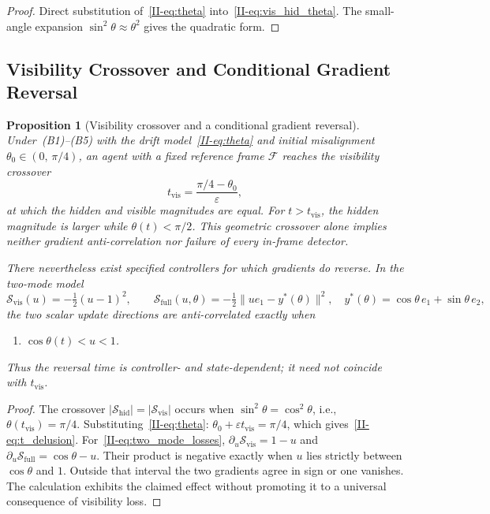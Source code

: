 \documentclass[12pt,a4paper,openany]{book}
\newtheorem{proposition}[theorem]{Proposition}
\begin{document}
\begin{proof}
Direct substitution of~\eqref{II-eq:theta}
into~\eqref{II-eq:vis_hid_theta}.
The small-angle expansion $\sin^2\theta\approx\theta^2$ gives the
quadratic form.
\end{proof}

\subsection{Visibility Crossover and Conditional Gradient Reversal}
\label{II-subsec:delusion}

\begin{proposition}[Visibility crossover and a conditional gradient reversal]
\label{II-prop:delusion_model}
Under~\textup{(B1)--(B5)} with the drift
model~\eqref{II-eq:theta} and initial misalignment
$\theta_0 \in (0,\,\pi/4)$, an agent with a fixed
reference frame $\mathcal{F}$ reaches the visibility crossover
\begin{equation}
\label{II-eq:t_delusion}
t_{\mathrm{vis}}
= \frac{\pi/4-\theta_0}{\varepsilon},
\end{equation}
at which the hidden and visible magnitudes are equal.  For
$t>t_{\mathrm{vis}}$, the hidden magnitude is larger while
$\theta(t)<\pi/2$.  This geometric crossover alone implies neither
gradient anti-correlation nor failure of every in-frame detector.

There nevertheless exist specified controllers for which gradients do
reverse.  In the two-mode model
\begin{equation}
\label{II-eq:two_mode_losses}
\mathcal S_{\mathrm{vis}}(u)=-\tfrac12(u-1)^2,
\qquad
\mathcal S_{\mathrm{full}}(u,\theta)
=-\tfrac12\lVert u e_1-y^*(\theta)\rVert^2,
\quad
y^*(\theta)=\cos\theta\,e_1+\sin\theta\,e_2,
\end{equation}
the two scalar update directions are anti-correlated exactly when
\begin{enumerate}
\item[] $\cos\theta(t)<u<1$.
\end{enumerate}
Thus the reversal time is controller- and state-dependent; it need not
coincide with $t_{\mathrm{vis}}$.
\end{proposition}

\begin{proof}
The crossover $|\mathcal{S}_{\mathrm{hid}}|
= |\mathcal{S}_{\mathrm{vis}}|$ occurs when
$\sin^2\theta = \cos^2\theta$, i.e.,
$\theta(t_{\mathrm{vis}}) = \pi/4$.
Substituting~\eqref{II-eq:theta}:
$\theta_0+\varepsilon t_{\mathrm{vis}} = \pi/4$,
which gives~\eqref{II-eq:t_delusion}.
For~\eqref{II-eq:two_mode_losses},
$\partial_u\mathcal S_{\mathrm{vis}}=1-u$ and
$\partial_u\mathcal S_{\mathrm{full}}=\cos\theta-u$.
Their product is negative exactly when $u$ lies strictly between
$\cos\theta$ and $1$.  Outside that interval the two gradients agree
in sign or one vanishes.  The calculation exhibits the claimed effect
without promoting it to a universal consequence of visibility loss.
\end{proof}
\end{document}
